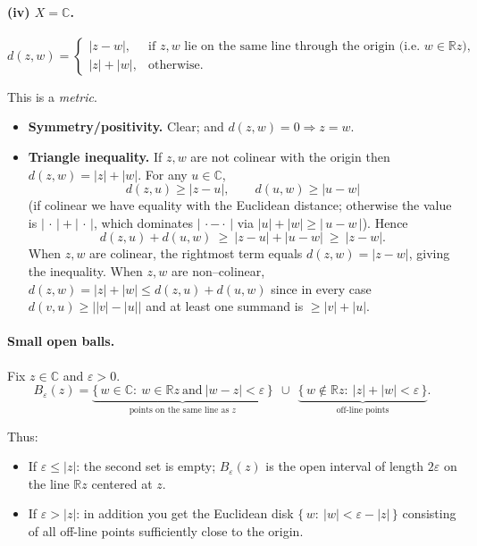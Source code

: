 \documentclass[12pt,a4paper]{article}
\theoremstyle{plain}
\theoremstyle{definition}
\theoremstyle{remark}
\theoremstyle{remark}
\begin{document}
\paragraph{(iv) $X=\mathbb C$.}
\[
d(z,w)=
\begin{cases}
	|z-w|, & \text{if $z,w$ lie on the same line through the origin (i.e.\ } w\in \mathbb R z),\\[2mm]
	|z|+|w|, & \text{otherwise.}
\end{cases}
\]

This is a \emph{metric}.

\begin{itemize}
	\item \textbf{Symmetry/positivity.} Clear; and $d(z,w)=0 \Rightarrow z=w$.
	\item \textbf{Triangle inequality.}  
	If $z,w$ are not colinear with the origin then $d(z,w)=|z|+|w|$.  
	For any $u\in\mathbb C$,
	\[
	d(z,u)\ge |z-u|,\qquad d(u,w)\ge |u-w|
	\]
	(if colinear we have equality with the Euclidean distance; otherwise the value is
	$|\,\cdot\,|+|\,\cdot\,|$, which dominates $|\,\cdot-\cdot\,|$ via
	$|u|+|w|\ge |\,u-w\,|$). Hence
	\[
	d(z,u)+d(u,w)\ \ge\ |z-u|+|u-w|\ \ge\ |z-w|.
	\]
	When $z,w$ are colinear, the rightmost term equals $d(z,w)=|z-w|$, giving the inequality.
	When $z,w$ are non–colinear, $d(z,w)=|z|+|w| \le d(z,u)+d(u,w)$ since in every case
	$d(v,u)\ge \big||v|-|u|\big|$ and at least one summand is $\ge |v|+|u|$.
\end{itemize}

\noindent\hrulefill

\paragraph{Small open balls.} Fix $z\in\mathbb C$ and $\varepsilon>0$.
\[
B_\varepsilon(z)=
\underbrace{\{\,w\in\mathbb C:\ w\in \mathbb R z\ \text{and}\ |w-z|<\varepsilon\,\}}_{\text{points on the same line as }z}
\ \ \cup\ \
\underbrace{\{\,w\notin \mathbb R z:\ |z|+|w|<\varepsilon\,\}}_{\text{off-line points}}.
\]

Thus:
\begin{itemize}
	\item If $\varepsilon\le |z|$: the second set is empty; $B_\varepsilon(z)$ is the open interval
	of length $2\varepsilon$ on the line $\mathbb R z$ centered at $z$.
	\item If $\varepsilon>|z|$: in addition you get the Euclidean disk
	$\{\,w:\ |w|<\varepsilon-|z|\,\}$ consisting of all off-line points sufficiently
	close to the origin.
\end{itemize}
\end{document}
